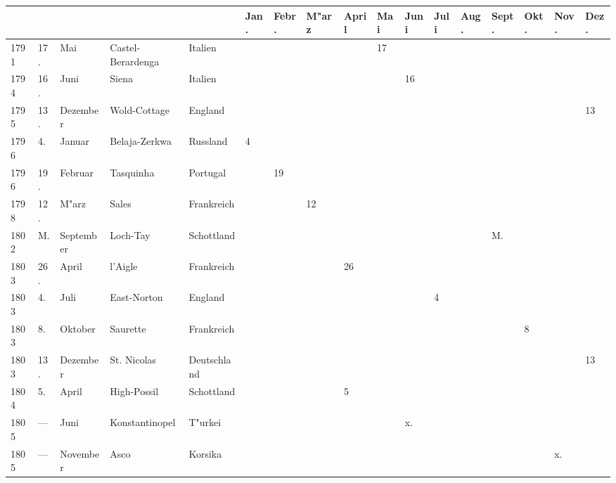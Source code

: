 \documentclass[a4paper, 8pt, oneside, polutonikogreek, german]{article}
\begin{document}
\begin{landscape}
\vspace*{\fill}
\begin{table}[H]
    \footnotesize
    \centering
    \begin{longtable}{|p{5mm}|p{4mm}|p{13mm}|p{22mm}|p{15mm}|p{4mm}|p{6mm}|p{6mm}|p{6mm}|p{4mm}|p{5mm}|p{4mm}|p{5mm}|p{6mm}|p{5mm}|p{5mm}|p{5mm}|}
    \hline
         &  &  &  &  & Jan. & Febr. & M"arz & April & Mai & Juni & Juli & Aug. & Sept. & Okt. & Nov. & Dez. \\ \hline
        1791 & 17. & Mai & Castel-Berardenga & Italien & ~ & ~ & ~ & ~ & 17 & ~ & ~ & ~ & ~ & ~ & ~ & ~ \\ \hline
        1794 & 16. & Juni & Siena & Italien & ~ & ~ & ~ & ~ & ~ & 16 & ~ & ~ & ~ & ~ & ~ & ~ \\ \hline
        1795 & 13. & Dezember & Wold-Cottage & England & ~ & ~ & ~ & ~ & ~ & ~ & ~ & ~ & ~ & ~ & ~ & 13 \\ \hline
        1796 & 4. & Januar & Belaja-Zerkwa & Russland & 4 & ~ & ~ & ~ & ~ & ~ & ~ & ~ & ~ & ~ & ~ & ~ \\ \hline
        1796 & 19. & Februar & Tasquinha & Portugal & ~ & 19 & ~ & ~ & ~ & ~ & ~ & ~ & ~ & ~ & ~ & ~ \\ \hline
        1798 & 12. & M"arz & Sales & Frankreich & ~ & ~ & 12 & ~ & ~ & ~ & ~ & ~ & ~ & ~ & ~ & ~ \\ \hline
        1802 & M. & September & Loch-Tay & Schottland & ~ & ~ & ~ & ~ & ~ & ~ & ~ & ~ & M. & ~ & ~ & ~ \\ \hline
        1803 & 26. & April & l’Aigle & Frankreich & ~ & ~ & ~ & 26 & ~ & ~ & ~ & ~ & ~ & ~ & ~ & ~ \\ \hline
        1803 & 4. & Juli & East-Norton & England & ~ & ~ & ~ & ~ & ~ & ~ & 4 & ~ & ~ & ~ & ~ & ~ \\ \hline
        1803 & 8. & Oktober & Saurette & Frankreich & ~ & ~ & ~ & ~ & ~ & ~ & ~ & ~ & ~ & 8 & ~ & ~ \\ \hline
        1803 & 13. & Dezember & St. Nicolas & Deutschland & ~ & ~ & ~ & ~ & ~ & ~ & ~ & ~ & ~ & ~ & ~ & 13 \\ \hline
        1804 & 5. & April & High-Possil & Schottland & ~ & ~ & ~ & 5 & ~ & ~ & ~ & ~ & ~ & ~ & ~ & ~ \\ \hline
        1805 & --- & Juni & Konstantinopel & T"urkei & ~ & ~ & ~ & ~ & ~ & x. & ~ & ~ & ~ & ~ & ~ & ~ \\ \hline
        1805 & --- & November & Asco & Korsika & ~ & ~ & ~ & ~ & ~ & ~ & ~ & ~ & ~ & ~ & x. & ~ \\ \hline

\end{longtable}
\end{table}
\end{landscape}
\end{document}
